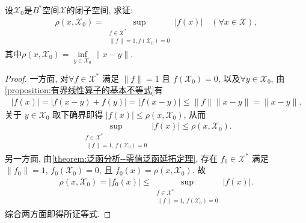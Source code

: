 \documentclass[../../main.tex]{subfiles}%
\begin{document}
\begin{example}
设$\mathscr{X}_0$是$B^*$空间$\mathscr{X}$的闭子空间, 求证:
\begin{align*}
\rho(x, \mathscr{X}_0) = \sup\limits_{\substack{f \in \mathscr{X}^* \\ \|f\| = 1, f(\mathscr{X}_0) = 0}} |f(x)| \quad (\forall x \in \mathscr{X}),
\end{align*}
其中$\rho(x, \mathscr{X}_0) = \inf\limits_{y \in \mathscr{X}_0} \|x - y\|$.
\end{example}
\begin{proof}
一方面, 对$\forall f \in \mathscr{X}^*$ 满足 $\|f\| = 1$ 且 $f(\mathscr{X}_0) = 0$, 以及$\forall y \in \mathscr{X}_0$, 由\cref{proposition:有界线性算子的基本不等式}有
\begin{align*}
|f(x)| = |f(x - y)+f(y)|=|f(x-y)| \leqslant \|f\| \|x - y\| = \|x - y\|.
\end{align*}
关于 $y \in \mathscr{X}_0$ 取下确界即得 $|f(x)| \leqslant \rho(x, \mathscr{X}_0)$, 从而
\begin{align*}
\sup\limits_{\substack{f \in \mathscr{X}^* \\ \|f\| = 1, \, f(\mathscr{X}_0) = 0}} |f(x)| \leqslant \rho(x, \mathscr{X}_0).
\end{align*}
另一方面, 由\cref{theorem:泛函分析--零值泛函延拓定理}, 存在 $f_0 \in \mathscr{X}^*$ 满足 $\|f_0\| = 1$, $f_0(\mathscr{X}_0) = 0$, 且 $f_0(x) = \rho(x, \mathscr{X}_0)$. 故
\begin{align*}
\rho(x, \mathscr{X}_0) = |f_0(x)| \leqslant \sup\limits_{\substack{f \in \mathscr{X}^* \\ \|f\| = 1, \, f(\mathscr{X}_0) = 0}} |f(x)|.
\end{align*}
综合两方面即得所证等式.
\end{proof}
\end{document}
